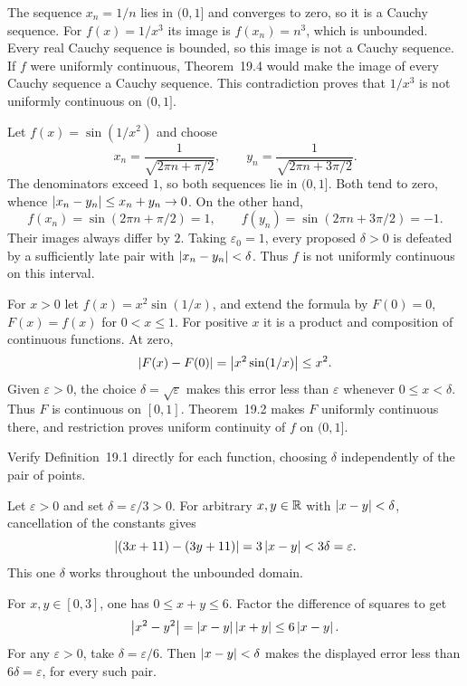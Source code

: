 \step{(e) The reciprocal cube on $(0,1]$.}
The sequence $x_n=1/n$ lies in $(0,1]$ and converges to zero,
so it is a Cauchy sequence. For $f(x)=1/x^3$ its image is
$f(x_n)=n^3$, which is unbounded. Every real Cauchy sequence is
bounded, so this image is not a Cauchy sequence. If $f$ were
uniformly continuous, Theorem~19.4 would make the image of every
Cauchy sequence a Cauchy sequence. This contradiction proves
that $1/x^3$ is not uniformly continuous on $(0,1]$.

\step{(f) The rapidly oscillating sine on $(0,1]$.}
Let $f(x)=\sin(1/x^2)$ and choose
\[
 x_n=\frac1{\sqrt{2\pi n+\pi/2}},\qquad
 y_n=\frac1{\sqrt{2\pi n+3\pi/2}}.
\]
The denominators exceed $1$, so both sequences lie in $(0,1]$.
Both tend to zero, whence
$\left|x_n-y_n\right|\le x_n+y_n\to0$. On the other hand,
\[
 f(x_n)=\sin(2\pi n+\pi/2)=1,\qquad
 f(y_n)=\sin(2\pi n+3\pi/2)=-1.
\]
Their images always differ by $2$. Taking $\varepsilon_0=1$,
every proposed $\delta>0$ is defeated by a sufficiently late
pair with $\left|x_n-y_n\right|<\delta$. Thus $f$ is not uniformly
continuous on this interval.

\step{(g) The damped oscillation on $(0,1]$.}
For $x>0$ let $f(x)=x^2\sin(1/x)$, and extend the formula by
$F(0)=0$, $F(x)=f(x)$ for $0<x\le1$. For positive $x$ it is a
product and composition of continuous functions. At zero,
\[
 \left|F(x)-F(0)\right|=\left|x^2\sin(1/x)\right|\le x^2.
\]
Given $\varepsilon>0$, the choice $\delta=\sqrt\varepsilon$
makes this error less than $\varepsilon$ whenever
$0\le x<\delta$. Thus $F$ is continuous on $[0,1]$.
Theorem~19.2 makes $F$ uniformly continuous there, and restriction
proves uniform continuity of $f$ on $(0,1]$.

\goal Verify Definition~19.1 directly for each function, choosing
$\delta$ independently of the pair of points.

Let $\varepsilon>0$ and set $\delta=\varepsilon/3>0$.
For arbitrary $x,y\in\mathbb{R}$ with $\left|x-y\right|<\delta$, cancellation
of the constants gives
\[
 \left|(3x+11)-(3y+11)\right|
 =3\left|x-y\right|<3\delta=\varepsilon.
\]
This one $\delta$ works throughout the unbounded domain.

For $x,y\in[0,3]$, one has $0\le x+y\le6$. Factor the
difference of squares to get
\[
 \left|x^2-y^2\right|=\left|x-y\right|\left|x+y\right|\le6\left|x-y\right|.
\]
For any $\varepsilon>0$, take $\delta=\varepsilon/6$.
Then $\left|x-y\right|<\delta$ makes the displayed error less than
$6\delta=\varepsilon$, for every such pair.

